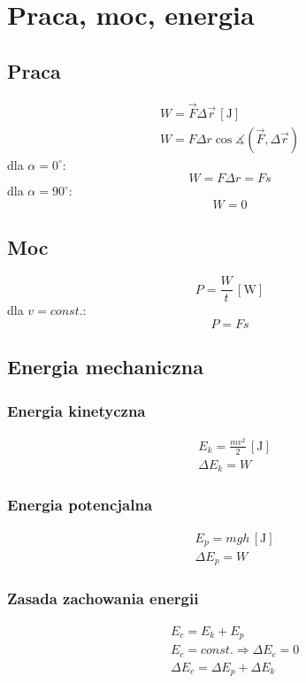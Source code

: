 \documentclass{article}
\numberwithin{equation}{section}
\newcommand{\unit}[1]{\, \left[\mathrm{#1}\right]}
\begin{document}
  \newpage
  \section{Praca, moc, energia}
    \subsection{Praca}
      \begin{gather}
        W = \vec F\Delta\vec r \unit{J}\\
        W = F\Delta r \cos\measuredangle (\vec F, \Delta\vec r)
      \end{gather}
      dla $\alpha = 0^\circ$:
      \begin{equation}
        W = F\Delta r = Fs
      \end{equation}
      dla $\alpha = 90^\circ$:
      \begin{equation}
        W = 0
      \end{equation}
    \subsection{Moc}
      \begin{equation}
        P = \frac{W}{t} \unit{W}
      \end{equation}
      dla $v = const.$:
      \begin{equation}
        P = Fs
      \end{equation}
    \subsection{Energia mechaniczna}
      \subsubsection{Energia kinetyczna}
        \begin{align}
          &E_k = \frac{mv^2}{2} \unit{J}\\
          &\Delta E_k = W
        \end{align}
      \subsubsection{Energia potencjalna}
        \begin{align}
          &E_p = mgh \unit{J}\\
          &\Delta E_p = W
        \end{align}
      \subsubsection{Zasada zachowania energii}
        \begin{align}
          &E_c = E_k + E_p\\
          &E_c = const. \Rightarrow \Delta E_c = 0\\
          &\Delta E_c = \Delta E_p + \Delta E_k
        \end{align}
\end{document}
